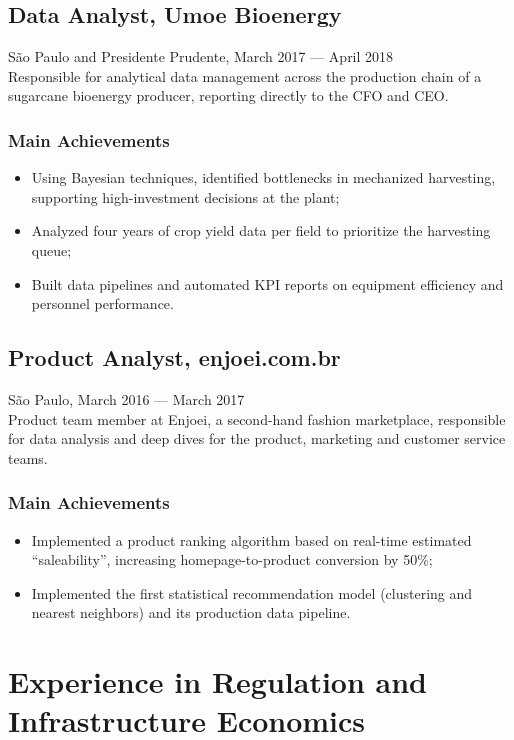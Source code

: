 \documentclass{article}
\newcommand{\jobdate}[3]{
\large
\vspace{0.05em}
  {#1, #2 --- #3}
\vspace{0.5em}
\\
}
\begin{document}
\subsection{Data Analyst, Umoe Bioenergy}
\jobdate{São Paulo and Presidente Prudente}{March 2017}{April 2018}
Responsible for analytical data management across the production chain of a sugarcane bioenergy producer, reporting directly to the CFO and CEO.
\subsubsection{Main Achievements}

\begin{itemize}
\item{Using Bayesian techniques, identified bottlenecks in mechanized harvesting, supporting high-investment decisions at the plant;}
\item{Analyzed four years of crop yield data per field to prioritize the harvesting queue;}
\item{Built data pipelines and automated KPI reports on equipment efficiency and personnel performance.}
\end{itemize}

\subsection{Product Analyst, enjoei.com.br}
\jobdate{São Paulo}{March 2016}{March 2017}
Product team member at Enjoei, a second-hand fashion marketplace, responsible for data analysis and deep dives for the product, marketing and customer service teams.
\subsubsection{Main Achievements}

\begin{itemize}
\item{Implemented a product ranking algorithm based on real-time estimated ``saleability'', increasing homepage-to-product conversion by 50\%;}
\item{Implemented the first statistical recommendation model (clustering and nearest neighbors) and its production data pipeline.}
\end{itemize}

\section{Experience in Regulation and Infrastructure Economics}
\end{document}
